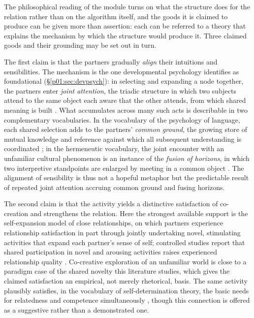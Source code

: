 The philosophical reading of the module turns on what the structure does for the relation rather than on the algorithm itself, and the goods it is claimed to produce can be given more than assertion: each can be referred to a theory that explains the mechanism by which the structure would produce it. Three claimed goods and their grounding may be set out in turn.

The first claim is that the partners gradually \emph{align} their intuitions and sensibilities. The mechanism is the one developmental psychology identifies as foundational (§\ref{p01:sec:devpsych}): in selecting and expanding a node together, the partners enter \emph{joint attention}, the triadic structure in which two subjects attend to the same object each aware that the other attends, from which shared meaning is built \parencite{tomasello2005intentions}. What accumulates across many such acts is describable in two complementary vocabularies. In the vocabulary of the psychology of language, each shared selection adds to the partners' \emph{common ground}, the growing store of mutual knowledge and reference against which all subsequent understanding is coordinated \parencite{clark1996using}; in the hermeneutic vocabulary, the joint encounter with an unfamiliar cultural phenomenon is an instance of the \emph{fusion of horizons}, in which two interpretive standpoints are enlarged by meeting in a common object \parencite{gadamer1960truth}. The alignment of sensibility is thus not a hopeful metaphor but the predictable result of repeated joint attention accruing common ground and fusing horizons.

The second claim is that the activity yields a distinctive satisfaction of co-creation and strengthens the relation. Here the strongest available support is the self-expansion model of close relationships, on which partners experience relationship satisfaction in part through jointly undertaking novel, stimulating activities that expand each partner's sense of self; controlled studies report that shared participation in novel and arousing activities raises experienced relationship quality \parencite{aron1986love, aron2000couples}. Co-creative exploration of an unfamiliar world is close to a paradigm case of the shared novelty this literature studies, which gives the claimed satisfaction an empirical, not merely rhetorical, basis. The same activity plausibly satisfies, in the vocabulary of self-determination theory, the basic needs for relatedness and competence simultaneously \parencite{deci2000what}, though this connection is offered as a suggestive rather than a demonstrated one.

